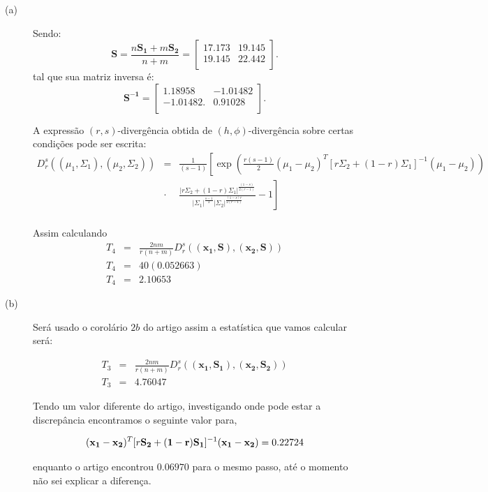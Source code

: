 \documentclass[12pt,a4paper]{article}
\begin{document}
\begin{description}
\item[(a)] Sendo:
$$
		\mathbf{S}=\frac{n\mathbf{S_1}+m\mathbf{S_2}}{n+m} = \left[
\begin{array}{cc}
	 17.173  & 19.145   \\
         19.145  & 22.442   \\
\end{array}
\right].
$$
tal que sua matriz inversa é:
$$
		\mathbf{S^{-1}} = \left[
\begin{array}{cc}
	 1.18958  & -1.01482   \\
        -1.01482.  & 0.91028   \\
\end{array}
\right].
$$

		A expressão $(r,s)$-divergência obtida de $(h,\phi)$-divergência sobre certas condições pode ser escrita:
\begin{equation}\label{eqn84}
\begin{array}{ccl}
	D_r^s((\mu_1,\Sigma_1),(\mu_2,\Sigma_2))&=&\frac{1}{(s-1)}\left[\exp\left(\frac{r(s-1)}{2}(\mu_1-\mu_2)^{T}[r\Sigma_2+(1-r)\Sigma_1]^{-1}(\mu_1-\mu_2) \right)\right. \\
	&\cdot&\left.\frac{|r\Sigma_2+(1-r)\Sigma_1|^{\frac{(1-s)}{2(r-1)}}}{|\Sigma_1|^{\frac{s-1}{2}}|\Sigma_2|^{\frac{(1-s)r}{2(r-1)}}}-1\right]  \\
\end{array}
\end{equation}

Assim calculando
\begin{equation}\label{eqn85}
\begin{array}{ccc}
	T_4&=&\frac{2nm}{r(n+m)}D_r^s((\mathbf{x_1}, \mathbf{S}),(\mathbf{x_2}, \mathbf{S})) \\
	T_4&=&40(0.052663) \\
	T_4&=&2.10653
\end{array}
\end{equation}
\item[(b)] Será usado o corolário $2b$ do artigo \cite{salicru_pardo_1994} assim a estatística que vamos calcular será:

\begin{equation}\label{eqn86}
\begin{array}{ccc}
	T_3&=&\frac{2nm}{r(n+m)}D_r^s((\mathbf{x_1}, \mathbf{S_1}),(\mathbf{x_2}, \mathbf{S_2})) \\
	T_3&=&4.76047
\end{array}
\end{equation}

Tendo um valor diferente do artigo, investigando onde pode estar a discrepância encontramos o seguinte valor para, 

\begin{equation}\label{eqn87}
	(\mathbf{x_1}-\mathbf{x_2})^T [r\mathbf{S_2+(1-r)S_1}]^{-1}(\mathbf{x_1-x_2})= 0.22724\\
\end{equation}

enquanto o artigo encontrou $0.06970$ para o mesmo passo, até o momento não sei explicar a diferença.

\end{description}
\end{document}
